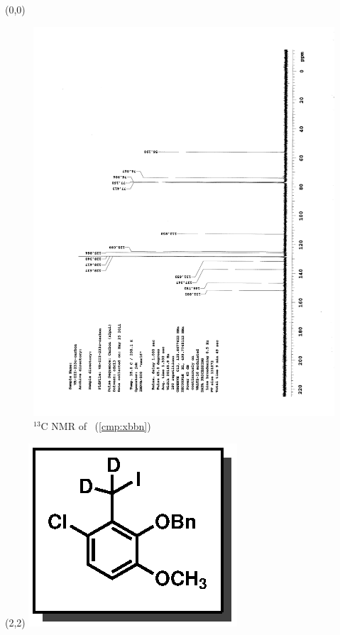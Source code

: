 \clearpage
\begin{textblock}{20}(0,0)
\begin{figure}[htb]
\caption{$^{13}$C NMR of  \CMPxbbn\ (\ref{cmp:xbbn})}
\includegraphics[scale=0.75, trim = 0mm 0mm 0mm 5mm,
clip]{chp_singlecarbon/images/nmr/xbbnC}
\vspace{-100pt}
\end{figure}
\end{textblock}
\begin{textblock}{1}(2,2)
\includegraphics[scale=0.8, angle=90]{chp_singlecarbon/images/xbbn}
\end{textblock}
\clearpage
